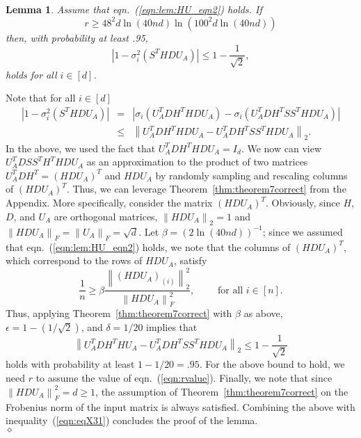 \documentclass[11pt]{article}
\newcommand{\FNorm }[1]{\mbox{}\left\|#1\right\|_F  }
\newcommand{\FNormS}[1]{\mbox{}\left\|#1\right\|_F^2}
\newcommand{\TNorm }[1]{\mbox{}\left\|#1\right\|_2  }
\newcommand{\VTTNormS}[1]{\mbox{}\left\|#1\right\|_2^2}
\newcommand{\abs }[1]{\left|#1\right|}
\newtheorem{lemma}{Lemma}
\newenvironment{Proof}{\noindent {\em Proof:}}{\\\hspace*{\fill}\mbox{$\diamond$}}
\begin{document}
\begin{lemma}
\label{lem:sample_lem20pf}
Assume that eqn.~(\ref{eqn:lem:HU_eqn2}) holds. If
\begin{equation}\label{eqn:rvalue}
r \geq 48^2 d \ln\left(40nd\right)\ln\left(100^2d \ln \left(40nd\right)\right)
\end{equation}
then, with probability at least .95,
$$\abs{1 - \sigma_i^2\left(S^THDU_A\right)} \leq 1-\frac{1}{\sqrt{2}}, $$
holds for all $i \in [d]$.
\end{lemma}
\begin{Proof}
Note that for all $i \in [d]$
\begin{eqnarray}
\abs{1 - \sigma_i^2\left(S^THDU_A\right)} \nonumber
   &=&    \abs{\sigma_i\left(U_A^TDH^THDU_A\right)
            - \sigma_i\left(U_A^TDH^TSS^THDU_A\right)}    \\
\label{eqn:eqX31}
   &\leq& \TNorm{U_A^TDH^THDU_A - U_A^TDH^TSS^THDU_A}.
\end{eqnarray}
In the above, we used the fact that $U_A^TDH^THD U_A = I_d$. We now can view $U_A^TDSS^TH^THDU_A$ as an approximation to the product of two matrices $U_A^TDH^T=\left(HDU_A\right)^T$ and $HDU_A$ by randomly sampling and rescaling columns of $\left(HDU_A\right)^T$. Thus, we can leverage Theorem~\ref{thm:theorem7correct} from the Appendix. More specifically, consider the matrix $\left(HDU_A\right)^T$. Obviously, since $H$, $D$, and $U_A$ are orthogonal matrices, $\TNorm{HDU_A}=1$ and $\FNorm{HDU_A}=\FNorm{U_A}=\sqrt{d}$. Let $\beta = \left(2\ln(40nd)\right)^{-1}$; since we assumed that eqn.~(\ref{eqn:lem:HU_eqn2}) holds, we note that the columns of $\left(HDU_A\right)^T$, which correspond to the rows of $HDU_A$, satisfy
\begin{equation}
\label{eqn:unif_prob_OK} \frac{1}{n}
   \ge  \beta \frac{\VTTNormS{\left(HDU_A\right)_{(i)}}}{\FNormS{HDU_A}}, \qquad
       \text{ for all } i \in [n]   .
\end{equation}
Thus, applying Theorem~\ref{thm:theorem7correct} with $\beta$ as above, $\epsilon = 1 - \left(1/\sqrt{2}\right)$, and $\delta = 1/20$ implies that
$$\TNorm{U_A^TDH^THU_A - U_A^TDH^TSS^THDU_A} \leq 1-\frac{1}{\sqrt{2}} $$
holds with probability at least $1-1/20=.95$. For the above bound to hold, we need $r$ to assume the value of eqn.~(\ref{eqn:rvalue}). Finally, we note that since $\FNormS{HDU_A}=d \geq 1$, the assumption of Theorem~\ref{thm:theorem7correct} on the Frobenius norm of the input matrix is always satisfied. Combining the above with inequality~(\ref{eqn:eqX31}) concludes the proof of the lemma.
\end{Proof}
\end{document}
